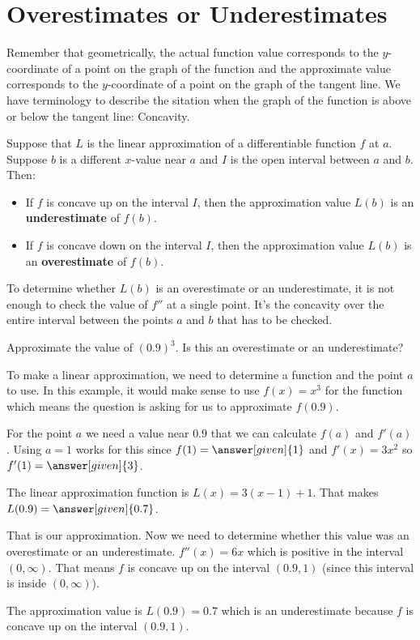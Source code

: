 \documentclass{ximera}
\begin{document}
\section{Overestimates or Underestimates}
Remember that geometrically, the actual function value corresponds to the $y$-coordinate of a point on the graph of the function and the approximate
value corresponds to the $y$-coordinate of a point on the graph of the tangent line. We have terminology to describe the sitation when the graph
of the function is above or below the tangent line: Concavity.

\begin{theorem}
	Suppose that $L$ is the linear approximation of a differentiable function $f$ at $a$. Suppose $b$ is a different $x$-value near $a$ and 
	$I$ is the open interval between $a$ and $b$. Then:
	\begin{itemize}
		\item If $f$ is concave up on the interval $I$, then the approximation value $L(b)$ is an \textbf{underestimate} of $f(b)$.
		\item If $f$ is concave down on the interval $I$, then the approximation value $L(b)$ is an \textbf{overestimate} of $f(b)$.
	\end{itemize} 
\end{theorem}
\begin{warning}
To determine whether $L(b)$ is an overestimate or an underestimate, it is not enough to check the value of $f''$ at a single point. It's the concavity
over the entire interval between the points $a$ and $b$ that has to be checked. 
\end{warning}

\begin{example}
	Approximate the value of $(0.9)^3$. Is this an overestimate or an underestimate?
	
	\begin{explanation}
		To make a linear approximation, we need to determine a function and the point $a$ to use. In this example, it would make sense
		to use $f(x) = x^3$ for the function which means the question is asking for us to approximate $f(0.9)$. 
		
		For the point $a$ we need a value near $0.9$ that we can calculate $f(a)$ and $f'(a)$. Using $a=1$ works for this
		since $f(1) = \answer[given]{1}$ and $f'(x) = 3x^2$ so $f'(1) = \answer[given]{3}$.
		
		The linear approximation function is $L(x) = 3(x-1)+1$. That makes $L(0.9) = \answer[given]{0.7}$.

		That is our approximation. Now we need to determine whether this value was an overestimate or an underestimate.
		$f''(x) = 6x$ which is positive in the interval $(0, \infty)$. That means $f$ is concave up on the interval $(0.9, 1)$ (since this interval
		is inside $(0,\infty)$). 
		
		The approximation value is $L(0.9)=0.7$ which is an underestimate because $f$ is concave up on the interval $(0.9,1)$.	 
	\end{explanation}
\end{example}
\end{document}
